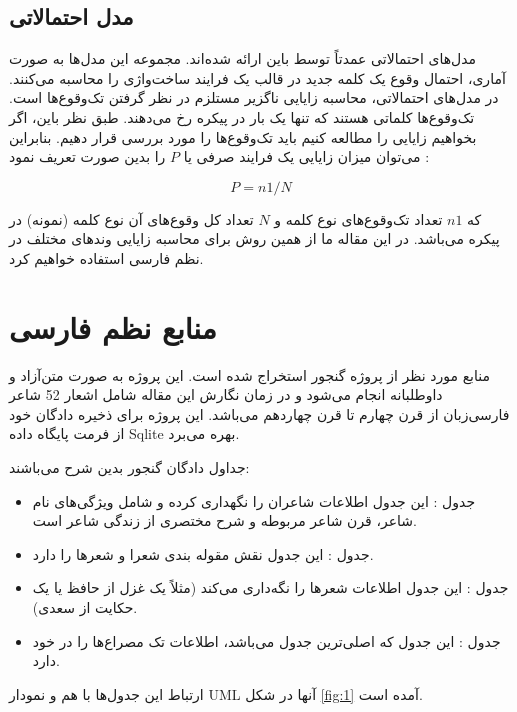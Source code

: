 \documentclass[12pt,onecolumn,a4paper]{article}
\begin{document}
    \subsection{مدل احتمالاتی}
    مدل‌های احتمالاتی عمدتاً توسط باین  ارائه شده‌اند. مجموعه این مدل‌ها به صورت آماری، احتمال وقوع یک کلمه جدید در قالب یک فرایند ساخت‌واژی را محاسبه می‌کنند. در مدل‌های احتمالاتی، محاسبه زایایی ناگزیر مستلزم در نظر گرفتن تک‌وقوع‌ها است. تک‌وقوع‌ها کلماتی هستند که تنها یک بار در پیکره رخ می‌دهند. طبق نظر باین، اگر بخواهیم زایایی را مطالعه کنیم باید تک‌وقوع‌ها را مورد بررسی قرار دهیم. بنابراین می‌توان میزان زایایی یک فرایند صرفی یا $P$ را بدین صورت تعریف نمود :

    \begin{equation}
        P = n1 / N\label{eq:2}
    \end{equation}

    که $n1$ تعداد تک‌وقوع‌های نوع کلمه و $N$ تعداد کل وقوع‌های آن نوع کلمه (نمونه) در پیکره می‌باشد. در این مقاله ما از همین روش برای محاسبه زایایی وندهای مختلف در نظم فارسی استفاده خواهیم کرد.

    \section{منابع نظم فارسی}
    منابع مورد نظر از پروژه گنجور  استخراج شده است. این پروژه به صورت متن‌آزاد و داوطلبانه انجام می‌شود و در زمان نگارش این مقاله شامل اشعار 52 شاعر فارسی‌زبان از قرن چهارم تا قرن چهاردهم می‌باشد. این پروژه برای ذخیره دادگان خود از فرمت پایگاه داده Sqlite بهره می‌برد.
    \par\noindent
    جداول دادگان گنجور بدین شرح می‌باشند:
    \begin{itemize}
        \item جدول : این جدول اطلاعات شاعران را نگهداری کرده و شامل ویژگی‌های نام شاعر، قرن شاعر مربوطه و شرح مختصری از زندگی شاعر است.
        \item جدول : این جدول نقش مقوله بندی شعرا و شعرها را دارد.
        \item جدول : این جدول اطلاعات شعرها را نگه‌داری می‌کند (مثلاً یک غزل از حافظ یا یک حکایت از سعدی).
        \item جدول : این جدول که اصلی‌ترین جدول می‌باشد، اطلاعات تک مصراع‌ها را در خود دارد.
    \end{itemize}
    \par
    ارتباط این جدول‌ها با هم و نمودار UML آنها در شکل \ref{fig:1} آمده است.
\end{document}
